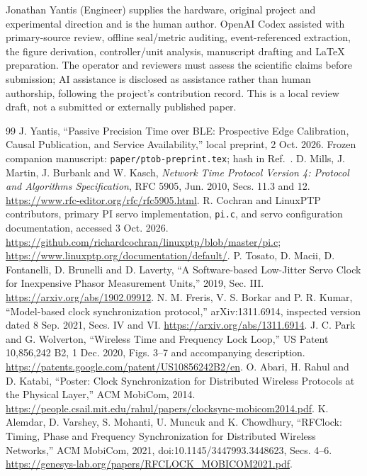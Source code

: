 \documentclass[11pt,letterpaper]{article}
\newcommand{\code}[1]{\texttt{\small #1}}
\begin{document}
Jonathan Yantis (Engineer) supplies the hardware, original project and experimental direction and is the human author. OpenAI Codex assisted with primary-source review, offline seal/metric auditing, event-referenced extraction, the figure derivation, controller/unit analysis, manuscript drafting and LaTeX preparation. The operator and reviewers must assess the scientific claims before submission; AI assistance is disclosed as assistance rather than human authorship, following the project's contribution record. This is a local review draft, not a submitted or externally published paper.

\begin{thebibliography}{99}\small
{} J. Yantis, ``Passive Precision Time over BLE: Prospective Edge Calibration, Causal Publication, and Service Availability,'' local preprint, 2 Oct. 2026. Frozen companion manuscript: \code{paper/ptob-preprint.tex}; hash in Ref.~\cite{evidence}.
 D. Mills, J. Martin, J. Burbank and W. Kasch, \emph{Network Time Protocol Version 4: Protocol and Algorithms Specification}, RFC 5905, Jun. 2010, Secs. 11.3 and 12. \url{https://www.rfc-editor.org/rfc/rfc5905.html}.
 R. Cochran and LinuxPTP contributors, primary PI servo implementation, \code{pi.c}, and servo configuration documentation, accessed 3 Oct. 2026. \url{https://github.com/richardcochran/linuxptp/blob/master/pi.c}; \url{https://www.linuxptp.org/documentation/default/}.
 P. Tosato, D. Macii, D. Fontanelli, D. Brunelli and D. Laverty, ``A Software-based Low-Jitter Servo Clock for Inexpensive Phasor Measurement Units,'' 2019, Sec. III. \url{https://arxiv.org/abs/1902.09912}.
 N. M. Freris, V. S. Borkar and P. R. Kumar, ``Model-based clock synchronization protocol,'' arXiv:1311.6914, inspected version dated 8 Sep. 2021, Secs. IV and VI. \url{https://arxiv.org/abs/1311.6914}.
 J. C. Park and G. Wolverton, ``Wireless Time and Frequency Lock Loop,'' US Patent 10,856,242 B2, 1 Dec. 2020, Figs. 3--7 and accompanying description. \url{https://patents.google.com/patent/US10856242B2/en}.
 O. Abari, H. Rahul and D. Katabi, ``Poster: Clock Synchronization for Distributed Wireless Protocols at the Physical Layer,'' ACM MobiCom, 2014. \url{https://people.csail.mit.edu/rahul/papers/clocksync-mobicom2014.pdf}.
 K. Alemdar, D. Varshey, S. Mohanti, U. Muncuk and K. Chowdhury, ``RFClock: Timing, Phase and Frequency Synchronization for Distributed Wireless Networks,'' ACM MobiCom, 2021, doi:10.1145/3447993.3448623, Secs. 4--6. \url{https://genesys-lab.org/papers/RFCLOCK_MOBICOM2021.pdf}.

\end{thebibliography}
\end{document}
